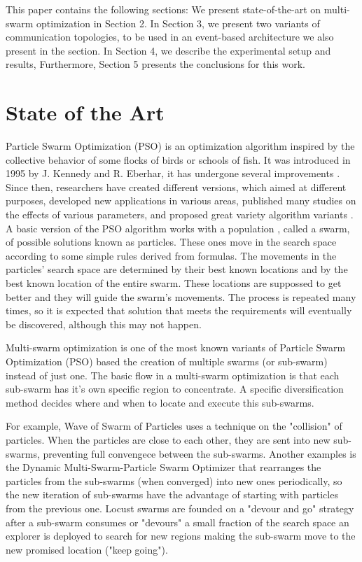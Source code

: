 \documentclass[runningheads]{llncs}
\begin{document}
This paper contains the following sections: We present state-of-the-art on
multi-swarm optimization in Section 2. In Section 3, we present two variants of communication topologies,
to be used in an event-based architecture we also present in the section. In Section 4, 
we describe the experimental setup and results, Furthermore,
Section 5 presents the conclusions for this work.

\section{State of the Art}

Particle Swarm Optimization (PSO) is an optimization algorithm
inspired by the collective behavior of some flocks of birds or schools of fish. It was introduced in 1995 by  J. Kennedy and
R. Eberhar, it has undergone several improvements \cite{b1}. %
Since then, researchers have created different versions, which aimed at different
purposes, developed new applications in various areas, published many studies on the effects of various parameters, and proposed great variety algorithm variants \cite{b2}. A basic version of the PSO algorithm
works with a population , called a swarm, of possible solutions
known as particles. These ones move in the search space according to
some simple rules derived from formulas. The movements in the particles' search space are
determined by their best known locations and by the best known location
of the entire swarm. These locations are suppossed to get better and they will
guide the swarm's movements. The process is repeated many times, so it
is expected that solution that meets the requirements will eventually be
discovered, although this may not happen\cite{b3}.



Multi-swarm optimization is one of the most known variants of Particle Swarm Optimization
(PSO) based the creation of multiple swarms (or sub-swarm) instead of just one. The basic flow in
a multi-swarm optimization is that each sub-swarm has it's own specific region to concentrate. A specific diversification method decides where and
when to locate and execute this sub-swarms.

For example, Wave of Swarm of Particles \cite{b6} uses a technique on the "collision" of particles. When the
particles are close to each other, they are sent into new sub-swarms,
preventing full convengece between the sub-swarms. Another examples is the Dynamic Multi-Swarm-Particle
Swarm Optimizer\cite{b7} that rearranges the particles from the sub-swarms
(when converged) into new ones periodically, so the new
iteration of sub-swarms have the advantage of starting with particles from the previous
one. Locust swarms \cite{b8} are founded on a "devour and go" strategy
after a sub-swarm consumes or "devours" a small fraction of the search space an explorer is deployed to search for
new regions making the sub-swarm move to the new promised location ("keep going").
\end{document}
